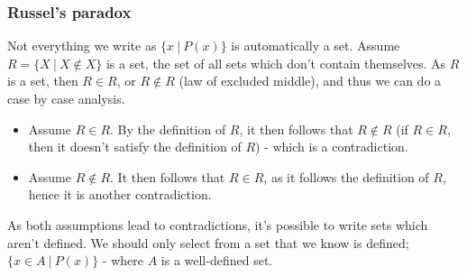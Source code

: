 \documentclass[a4paper, 12pt]{article}
\begin{document}
            \subsubsection*{Russel's paradox}
                Not everything we write as $\{x\ |\ P(x)\}$ is automatically a set. Assume $R = \{X\ |\ X \notin X\}$ is a set, the set of all sets which don't contain themselves. As $R$ is a set, then $R \in R$, or $R \notin R$ (law of excluded middle), and thus we can do a case by case analysis.

                \begin{itemize}
                    \item Assume $R \in R$. By the definition of $R$, it then follows that $R \notin R$ (if $R \in R$, then it doesn't satisfy the definition of $R$) - which is a contradiction.
                    \item Assume $R \notin R$. It then follows that $R \in R$, as it follows the definition of $R$, hence it is another contradiction.
                \end{itemize}

                As both assumptions lead to contradictions, it's possible to write sets which aren't defined. We should only select from a set that we know is defined; $\{x \in A\ |\ P(x)\}$ - where $A$ is a well-defined set.
\end{document}
